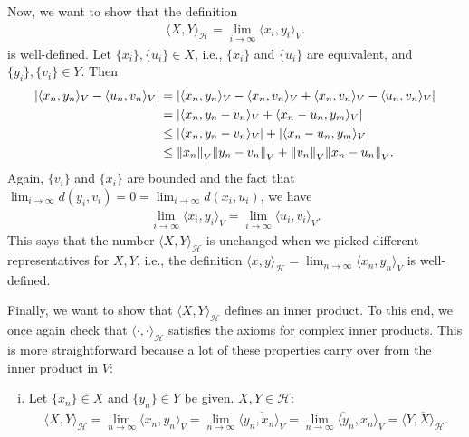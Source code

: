 \documentclass[11pt]{article}
\begin{document}
\begin{enumerate}[(a)]
\begin{itemize}
		
		Now, we want to show that the definition 
		\begin{align*}
		\langle X,Y\rangle_\mathcal{H} = \lim_{i\to \infty}\langle x_i, y_i\rangle_V.
		\end{align*}
		is well-defined. Let $\{x_i\}, \{u_i\} \in X$, i.e., $\{x_i\}$ and $\{u_i\}$ are equivalent, and $\{y_i\}, \{ v_i\} \in Y$. Then
		\begin{align*}
		\abs{\langle x_n,y_n\rangle_V - \langle u_n,v_n\rangle_V} &= \abs{\langle x_n,y_n \rangle_V - \langle x_n, v_n\rangle_V + \langle x_n,v_n \rangle_V - \langle u_n,v_n \rangle_V}\\
		&= \abs{\langle x_n, y_n -v_n \rangle_V  + \langle x_n-u_n, y_m \rangle_V }\\
		&\leq \abs{\langle x_n, y_n -v_n \rangle_V} + \abs{\langle x_n-u_n, y_m \rangle_V}\\
		&\leq \norm{x_n}_V\norm{y_n-v_n}_V + \norm{v_n}_V\norm{x_n - u_n}_V .
		\end{align*}
		Again, $\{v_i\}$ and $\{x_i\}$ are bounded and the fact that $\lim_{i\to\infty}d(y_i,v_i) = 0 = \lim_{i\to\infty}d(x_i,u_i)$, we have
		\begin{align*}
		\lim_{i\to \infty}\langle x_i,y_i\rangle_V = \lim_{i\to\infty}\langle u_i,v_i \rangle_V.
		\end{align*}
		This says that the number $\langle X,Y\rangle_\mathcal{H}$ is unchanged when we picked different representatives for $X,Y$, i.e., the definition $\langle x,y\rangle_\mathcal{H} = \lim_{n\to\infty}\langle x_n,y_n\rangle_V$ is well-defined. 
		
		
		Finally, we want to show that $\langle X,Y\rangle_{\mathcal{H}}$ defines an inner product. To this end, we once again check that $\langle \cdot,\cdot\rangle_\mathcal{H}$ satisfies the axioms for complex inner products. This is more straightforward because a lot of these properties carry over from the inner product in $V$:
		\begin{enumerate}[(i)]
			\item Let $\{x_n\} \in X$ and $\{y_n\} \in Y$ be given. $X,Y\in \mathcal{H}$:
 			\begin{align*}
			\langle X,Y \rangle_\mathcal{H} = \lim_{n\to \infty}\langle x_n,y_n \rangle_V = \lim_{n\to \infty}\overline{\langle y_n,x_n \rangle_V} = \overline{\lim_{n\to \infty}{\langle y_n,x_n \rangle_V}} = \overline{\langle Y,X\rangle_\mathcal{H}}.
			\end{align*}
			

\end{enumerate}
\end{itemize}
\end{enumerate}
\end{document}
